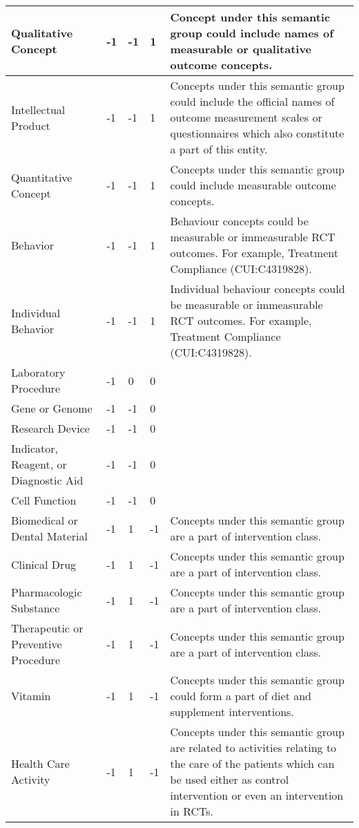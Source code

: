 \documentclass[10.7pt,]{article}
\begin{document}
\begin{longtable}{|l|p{0.3cm}|p{0.3cm}|p{0.3cm}|p{7.9cm}|}
        Qualitative Concept & -1 & -1 & 1 & Concept under this semantic group could include names of measurable or qualitative outcome concepts. \\ \hline
        Intellectual Product & -1 & -1 & 1 & Concepts under this semantic group could include the official names of outcome measurement scales or questionnaires which also constitute a part of this entity. \\ \hline
        Quantitative Concept & -1 & -1 & 1 & Concepts under this semantic group could include measurable outcome concepts. \\ \hline
        Behavior & -1 & -1 & 1 & Behaviour concepts could be measurable or immeasurable RCT outcomes. For example, Treatment Compliance (CUI:C4319828). \\ \hline
        Individual Behavior & -1 & -1 & 1 & Individual behaviour concepts could be measurable or immeasurable RCT outcomes. For example, Treatment Compliance (CUI:C4319828). \\ \hline
        Laboratory Procedure & -1 & 0 & 0 & ~ \\ \hline
        Gene or Genome & -1 & -1 & 0 & ~ \\ \hline
        Research Device & -1 & -1 & 0 & ~ \\ \hline
        Indicator, Reagent, or Diagnostic Aid & -1 & -1 & 0 & ~ \\ \hline
        Cell Function & -1 & -1 & 0 & ~ \\ \hline
        Biomedical or Dental Material & -1 & 1 & -1 & Concepts under this semantic group are a part of intervention class. \\ \hline
        Clinical Drug & -1 & 1 & -1 & Concepts under this semantic group are a part of intervention class. \\ \hline
        Pharmacologic Substance & -1 & 1 & -1 & Concepts under this semantic group are a part of intervention class. \\ \hline
        Therapeutic or Preventive Procedure & -1 & 1 & -1 & Concepts under this semantic group are a part of intervention class. \\ \hline
        Vitamin & -1 & 1 & -1 & Concepts under this semantic group could form a part of diet and supplement interventions. \\ \hline
        Health Care Activity & -1 & 1 & -1 & Concepts under this semantic group are related to activities relating to the care of the patients which can be used either as control intervention or even an intervention in RCTs. \\ \hline

\end{longtable}
\end{document}
